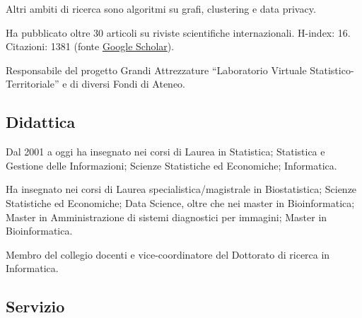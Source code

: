 \documentclass[
]{article}
\begin{document}
Altri ambiti di ricerca sono algoritmi su grafi, clustering e data
privacy.

Ha pubblicato oltre 30 articoli su riviste scientifiche internazionali.
H-index: 16. Citazioni: 1381 (fonte
\href{https://scholar.google.com/citations?user=0gaIFokAAAAJ\&hl=en\&oi=ao}{Google
Scholar}).

Responsabile del progetto Grandi Attrezzature ``Laboratorio Virtuale
Statistico-Territoriale'' e di diversi Fondi di Ateneo.

\hypertarget{didattica}{%
\subsection{Didattica}\label{didattica}}

Dal 2001 a oggi ha insegnato nei corsi di Laurea in Statistica;
Statistica e Gestione delle Informazioni; Scienze Statistiche ed
Economiche; Informatica.

Ha insegnato nei corsi di Laurea specialistica/magistrale in
Biostatistica; Scienze Statistiche ed Economiche; Data Science, oltre
che nei master in Bioinformatica; Master in Amministrazione di sistemi
diagnostici per immagini; Master in Bioinformatica.

Membro del collegio docenti e vice-coordinatore del Dottorato di ricerca
in Informatica.

\hypertarget{servizio}{%
\subsection{Servizio}\label{servizio}}
\end{document}
